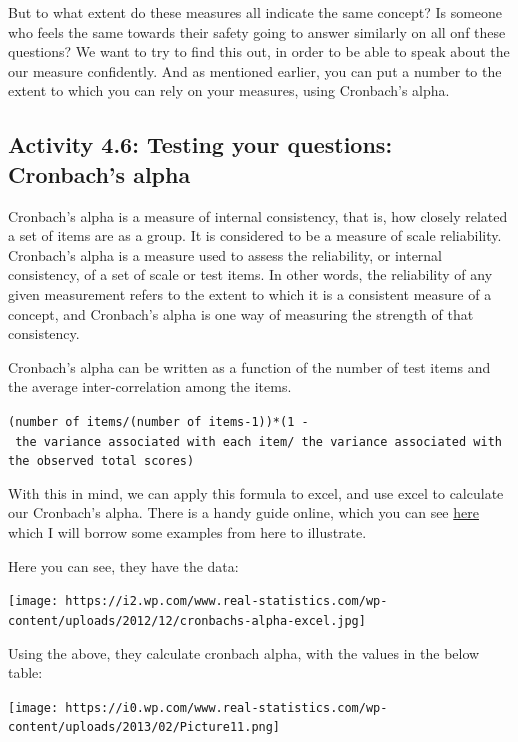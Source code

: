 \documentclass[
]{book}
\begin{document}
But to what extent do these measures all indicate the same concept? Is someone who feels the same towards their safety going to answer similarly on all onf these questions? We want to try to find this out, in order to be able to speak about the our measure confidently. And as mentioned earlier, you can put a number to the extent to which you can rely on your measures, using Cronbach's alpha.

\hypertarget{activity-4.6-testing-your-questions-cronbachs-alpha}{%
\subsection{Activity 4.6: Testing your questions: Cronbach's alpha}\label{activity-4.6-testing-your-questions-cronbachs-alpha}}

Cronbach's alpha is a measure of internal consistency, that is, how closely related a set of items are as a group. It is considered to be a measure of scale reliability. Cronbach's alpha is a measure used to assess the reliability, or internal consistency, of a set of scale or test items. In other words, the reliability of any given measurement refers to the extent to which it is a consistent measure of a concept, and Cronbach's alpha is one way of measuring the strength of that consistency.

Cronbach's alpha can be written as a function of the number of test items and the average inter-correlation among the items.

\texttt{(number\ of\ items/(number\ of\ items-1))*(1\ -\ the\ variance\ associated\ with\ each\ item/\ the\ variance\ associated\ with\ the\ observed\ total\ scores)}

With this in mind, we can apply this formula to excel, and use excel to calculate our Cronbach's alpha. There is a handy guide online, which you can see \href{http://www.real-statistics.com/reliability/internal-consistency-reliability/cronbachs-alpha/}{here} which I will borrow some examples from here to illustrate.

Here you can see, they have the data:

\texttt{[image: https://i2.wp.com/www.real-statistics.com/wp-content/uploads/2012/12/cronbachs-alpha-excel.jpg]}

Using the above, they calculate cronbach alpha, with the values in the below table:

\texttt{[image: https://i0.wp.com/www.real-statistics.com/wp-content/uploads/2013/02/Picture11.png]}
\end{document}
